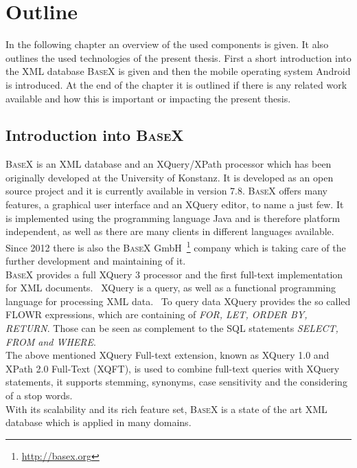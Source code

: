 \chapter{Outline}
\label{cha:overview}
In the following chapter an overview of the used components is given.
It also outlines the used technologies of the present thesis.
First a short introduction into the XML database \textsc{BaseX} is given and then the mobile operating system Android is introduced.
At the end of the chapter it is outlined if there is any related work available and how this is important or impacting the present thesis.

%

\section{Introduction into \textsc{BaseX}}
\label{sec:overview:introduction-into-basex}
\textsc{BaseX} is an XML database and an XQuery/XPath processor which has been originally developed at the University of Konstanz.
It is developed as an open source project and it is currently available in version 7.8.
\textsc{BaseX} offers many features, a graphical user interface and an XQuery editor, to name a just few.
It is implemented using the programming language Java and is therefore platform independent, as well as there are many clients in different languages available.
Since 2012 there is also the \textsc{BaseX} GmbH~\footnote{\url{http://basex.org}} company which is taking care of the further development and maintaining of it.\\
\textsc{BaseX} provides a full XQuery 3 processor and the first full-text implementation for XML documents.~\cite{grun2009xquery}
XQuery is a query, as well as a functional programming language for processing XML data.~\cite{boag2002xquery} 
To query data XQuery provides the so called FLOWR expressions, which are containing of \textit{FOR, LET, ORDER BY, RETURN}.
Those can be seen as complement to the SQL statements \textit{SELECT, FROM and WHERE}.\\
The above mentioned XQuery Full-text extension, known as XQuery 1.0 and XPath 2.0 Full-Text (XQFT), is used to combine full-text queries with XQuery statements, it supports stemming, synonyms, case sensitivity and the considering of a stop words.~\cite{amer2006xquery}\\
With its scalability and its rich feature set, \textsc{BaseX} is a state of the art XML database which is applied in many domains.


